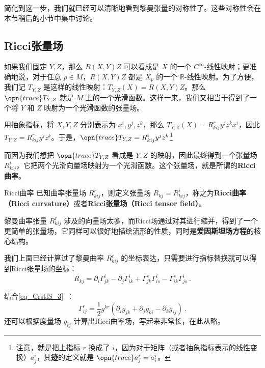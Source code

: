 简化到这一步，我们就已经可以清晰地看到黎曼张量的对称性了。这些对称性会在本节稍后的小节中集中讨论。











\subsection{Ricci张量场}

如果我们固定 $Y, Z$，那么 $R(X, Y)Z$ 可以看成是 $X$ 的一个 $C^{\infty}$-线性映射；更准确地说，对于任意 $p\in M$，$R(X, Y)Z$ 都是 $X_p$ 的一个 $\mathbb{R}$-线性映射。为了方便，我们记 $T_{Y, Z}$ 是这样的线性映射：$T_{Y, Z}(X)=R(X, Y)Z$。那么 $\opn{trace}T_{Y, Z}$ 就是 $M$ 上的一个光滑函数。这样一来，我们又相当于得到了一个将 $Y$ 和 $Z$ 映射为一个光滑函数的张量场。

用抽象指标，将 $X, Y, Z$ 分别表示为 $x^i, y^j, z^k$，那么 $T_{Y, Z}(X)=R^r_{kij}y^jz^kx^i$，因此 $T_{Y, Z}=R^r_{kij}y^jz^k$。于是，$\opn{trace}T_{Y, Z}=R^i_{kij}y^jz^k$\footnote{注意，就是把上指标 $r$ 换成了 $i$，因为对于矩阵（或者抽象指标表示的线性变换）$a^i_j$，其\textbf{迹}的定义就是 $\opn{trace}a^i_j=a^i_i$。}

而因为我们想把 $\opn{trace}T_{Y, Z}$ 看成是 $Y, Z$ 的映射，因此最终得到一个张量场 $R^i_{kij}$，它把两个光滑向量场映射为一个光滑函数。这个张量场，就是所谓的\textbf{Ricci曲率}。

\begin{definition}{Ricci曲率}
已知曲率张量场 $R^r_{kij}$，则定义张量场 $R_{kj}=R^i_{kij}$，称之为\textbf{Ricci曲率（Ricci curvature）}或者\textbf{Ricci张量场（Ricci tensor field）}。
\end{definition}

黎曼曲率张量 $R^r_{kij}$ 涉及的向量场太多，而Ricci场通过对其进行缩并，得到了一个更简单的张量场，它同样可以很好地描绘流形的性质，同时是\textbf{爱因斯坦场方程}的核心结构。

我们上面已经计算过了黎曼曲率 $R^r_{kij}$ 的坐标表达，只需要进行指标替换就可以得到Ricci张量场的坐标：
\begin{equation}\label{eq_RicciC_9}
R_{kj}=\partial_i\Gamma^i_{jk}-\partial_j\Gamma^{i}_{ik}+\Gamma^s_{jk}\Gamma^i_{is}-\Gamma^s_{ik}\Gamma^i_{js}~.
\end{equation}

结合\autoref{eq_CrstfS_3}~：
\begin{equation}
\Gamma^{r}_{ij}=\frac{1}{2}g^{kr}(\partial_ig_{jk}+\partial_jg_{ki}-\partial_kg_{ij})~.
\end{equation}
还可以根据度量场 $g_{ij}$ 计算出Ricci曲率场，写起来非常长，在此从略。





